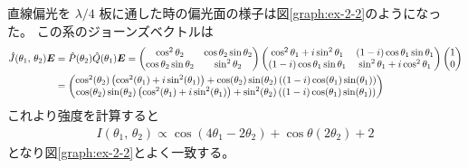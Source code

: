 \documentclass[9pt,dvipdfmx,a4paper]{jsarticle}
\begin{document}
直線偏光を \(\lambda/4\) 板に通した時の偏光面の様子は図\ref{graph:ex-2-2}のようになった。
この系のジョーンズベクトルは
\begin{align}
    \hat{J}(\theta_1,\,\theta_2)\vb*{E} &= \hat{P}(\theta_2)\hat{Q}(\theta_1)\vb*{E}=
    \begin{pmatrix}
        \cos^2\theta_2 & \cos\theta_2\sin\theta_2\\
        \cos\theta_2\sin\theta_2 & \sin^2\theta_2
    \end{pmatrix}
    \begin{pmatrix}
        \cos^2\theta_1+i\sin^2\theta_1 & (1-i)\cos\theta_1\sin\theta_1\\
        (1-i)\cos\theta_1\sin\theta_1 & \sin^2\theta_1 + i \cos^2\theta_1
    \end{pmatrix}
    \begin{pmatrix}
        1\\0
    \end{pmatrix}\notag\\
    &=\begin{pmatrix}
        \cos^2(\theta_2) \left( \cos^2(\theta_1) + i \sin^2(\theta_1) \right) + \cos(\theta_2) \sin(\theta_2) \left( (1 - i) \cos(\theta_1) \sin(\theta_1) \right) \\
        \cos(\theta_2) \sin(\theta_2) \left( \cos^2(\theta_1) + i \sin^2(\theta_1) \right) + \sin^2(\theta_2) \left( (1 - i) \cos(\theta_1) \sin(\theta_1) \right)
    \end{pmatrix}
\end{align}
これより強度を計算すると
\begin{align}
    I(\theta_1,\,\theta_2) \propto \cos(4\theta_1-2\theta_2)+\cos\theta(2\theta_2)+2
\end{align}
となり図\ref{graph:ex-2-2}とよく一致する。
\end{document}
